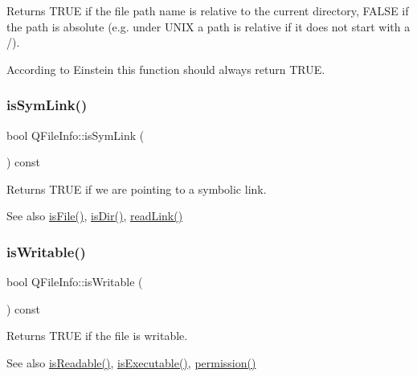 Returns T\+R\+UE if the file path name is relative to the current directory, F\+A\+L\+SE if the path is absolute (e.\+g. under U\+N\+IX a path is relative if it does not start with a \textquotesingle{}/\textquotesingle{}).

According to Einstein this function should always return T\+R\+UE. \mbox{\label{class_q_file_info_a0e8114893edbe9d471b6f1389add29fd}} 
\subsubsection{\texorpdfstring{isSymLink()}{isSymLink()}}
{\footnotesize\ttfamily bool Q\+File\+Info\+::is\+Sym\+Link (\begin{DoxyParamCaption}{ }\end{DoxyParamCaption}) const}

Returns T\+R\+UE if we are pointing to a symbolic link. \begin{DoxySeeAlso}{See also}
\mbox{\hyperlink{class_q_file_info_a6bc9021370d012084b9464ba22172d46}{is\+File()}}, \mbox{\hyperlink{class_q_file_info_a91a725dd517a4b77b15077e72a7a1501}{is\+Dir()}}, \mbox{\hyperlink{class_q_file_info_ad6d74b51c535f45dda430ac0d755f569}{read\+Link()}} 
\end{DoxySeeAlso}
\mbox{\label{class_q_file_info_ab2dcfc1ea9764ea5e6ea9cc684156c92}} 
\subsubsection{\texorpdfstring{isWritable()}{isWritable()}}
{\footnotesize\ttfamily bool Q\+File\+Info\+::is\+Writable (\begin{DoxyParamCaption}{ }\end{DoxyParamCaption}) const}

Returns T\+R\+UE if the file is writable. \begin{DoxySeeAlso}{See also}
\mbox{\hyperlink{class_q_file_info_af8795a46c49f6911a14f66218949f213}{is\+Readable()}}, \mbox{\hyperlink{class_q_file_info_a5b834ba486c5f6da3b429751ee84fd12}{is\+Executable()}}, \mbox{\hyperlink{class_q_file_info_a51ec346b961f115fd7e45664d27862db}{permission()}} 
\end{DoxySeeAlso}
\mbox{\label{class_q_file_info_a0dd39dbfc2db6a5af5222db19804e45a}} 
